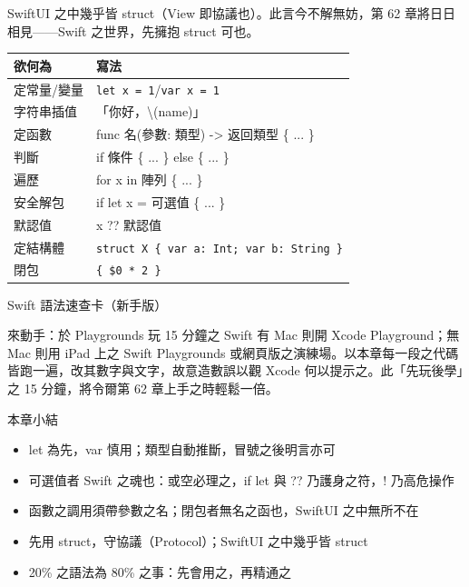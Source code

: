 SwiftUI 之中幾乎皆 struct（View 即協議也）。此言今不解無妨，第 62 章將日日相見——Swift 之世界，先擁抱 struct 可也。


\begin{center}
\begin{tabularx}{\linewidth}{|X|X|}
\hline
\textbf{欲何為} & \textbf{寫法} \tabularnewline
\hline
定常量/變量 & \texttt{let x = 1}/\texttt{var x = 1} \tabularnewline
字符串插值 & 「你好，\textbackslash{}(name)」 \tabularnewline
定函數 & func 名(參數: 類型) -> 返回類型 \{ ... \} \tabularnewline
判斷 & if 條件 \{ ... \} else \{ ... \} \tabularnewline
遍歷 & for x in 陣列 \{ ... \} \tabularnewline
安全解包 & if let x = 可選值 \{ ... \} \tabularnewline
默認值 & x ?? 默認值 \tabularnewline
定結構體 & \texttt{struct X \{ var a: Int; var b: String \}} \tabularnewline
閉包 & \texttt{\{ \$0 * 2 \}} \tabularnewline
\hline
\end{tabularx}
\end{center}

\begin{center}\small\color{gray}Swift 語法速查卡（新手版）\end{center}

\begin{tcbpractice}{來動手：於 Playgrounds 玩 15 分鐘之 Swift}
有 Mac 則開 Xcode Playground；無 Mac 則用 iPad 上之 Swift Playgrounds 或網頁版之演練場。以本章每一段之代碼皆跑一遍，改其數字與文字，故意造數誤以觀 Xcode 何以提示之。此「先玩後學」之 15 分鐘，將令爾第 62 章上手之時輕鬆一倍。

\end{tcbpractice}

\begin{tcbsummary}{本章小結}
\begin{itemize}
  \item let 為先，var 慎用；類型自動推斷，冒號之後明言亦可
  \item 可選值者 Swift 之魂也：或空必理之，if let 與 ?? 乃護身之符，! 乃高危操作
  \item 函數之調用須帶參數之名；閉包者無名之函也，SwiftUI 之中無所不在
  \item 先用 struct，守協議（Protocol）；SwiftUI 之中幾乎皆 struct
  \item 20\% 之語法為 80\% 之事：先會用之，再精通之
\end{itemize}

\end{tcbsummary}
